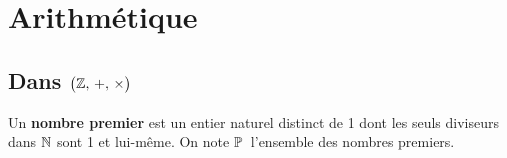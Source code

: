 \section{Arithmétique}
\vspace{0.8cm}
\subsection{Dans \(\bigl(\mathbb{Z},\,+,\,\times\bigr)\)}

\vspace{1cm}

Un \textbf{nombre premier} est un entier naturel distinct de 1 dont les seuls diviseurs dans $\mathbb{N}$ sont 1 et lui-même. On note $\mathbb{P}\,$ l'ensemble des nombres premiers.

\vspace{1.2cm}

